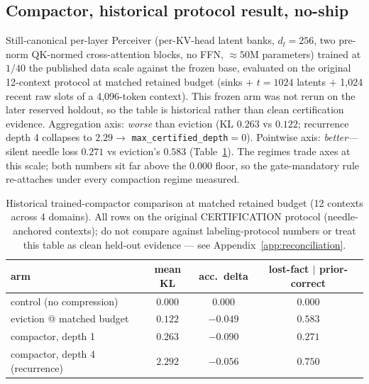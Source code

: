 \documentclass[11pt]{article}
\begin{document}
\subsection{Compactor, historical protocol result, no-ship}
Still-canonical per-layer Perceiver (per-KV-head latent banks, $d_l{=}256$,
two pre-norm QK-normed cross-attention blocks, no FFN, ${\approx}50$M
parameters) trained at $1/40$ the published data scale against the frozen
base, evaluated on the original 12-context protocol at matched retained
budget (sinks
$+$ $t{=}1024$ latents $+$ 1{,}024 recent raw slots of a 4{,}096-token
context). This frozen arm was not rerun on the later reserved holdout, so
the table is historical rather than clean certification evidence.
Aggregation axis: \emph{worse} than eviction (KL $0.263$ vs
$0.122$; recurrence depth 4 collapses to $2.29 \rightarrow$
\texttt{max\_certified\_depth}${}={}0$). Pointwise axis: \emph{better}---
silent needle loss $0.271$ vs eviction's $0.583$ (Table~\ref{tab:compactor}).
The regimes trade axes at this scale; both numbers sit far above the $0.000$
floor, so the gate-mandatory rule re-attaches under every compaction regime
measured.

\begin{table}[t]
\centering
\caption{Historical trained-compactor comparison at matched retained
budget (12 contexts across 4 domains). All rows on the original CERTIFICATION
protocol (needle-anchored contexts); do not compare against labeling-protocol
numbers or treat this table as clean held-out evidence --- see
Appendix~\ref{app:reconciliation}.}
\label{tab:compactor}
\begin{tabular}{lccc}
\toprule
arm & mean KL & acc.\ delta & lost-fact $\mid$ prior-correct \\
\midrule
control (no compression) & $0.000$ & $0.000$ & $0.000$ \\
eviction @ matched budget & $\mathbf{0.122}$ & $-0.049$ & $0.583$ \\
compactor, depth 1 & $0.263$ & $-0.090$ & $\mathbf{0.271}$ \\
compactor, depth 4 (recurrence) & $2.292$ & $-0.056$ & $0.750$ \\
\bottomrule
\end{tabular}
\end{table}
\end{document}
